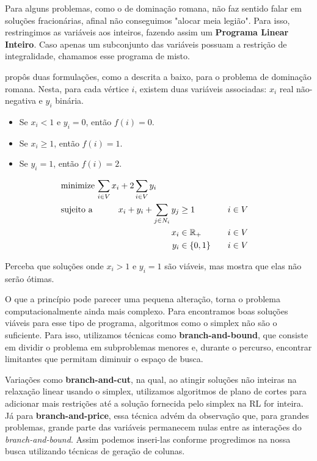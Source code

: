 \documentclass[11pt]{article}
\begin{document}
{Para alguns problemas, como o de dominação romana, não faz sentido falar em soluções fracionárias, afinal não conseguimos "alocar meia legião".
Para isso, restringimos as variáveis aos inteiros, fazendo assim um \textbf{Programa Linear Inteiro}. Caso apenas um subconjunto das variáveis possuam a restrição de integralidade, chamamos esse programa de misto.

\textcite{Ivanovic2016Improvedmixedinteger} propôs duas formulações, como a descrita a baixo, para o problema de dominação romana.
Nesta, para cada vértice \(i\), existem duas variáveis associadas: \(x_i\) real não-negativa e \(y_i\) binária.
\begin{itemize}
\item Se \(x_i < 1\) e \(y_i = 0\), então \(f(i) = 0\).
\item Se \(x_i \geq 1\), então \(f(i) = 1\).
\item Se \(y_i = 1\), então \(f(i) = 2\).
\end{itemize}

\begin{alignat*}{4}
& \omit\rlap{minimize  $\displaystyle \sum_{i \in V} x_i+2\sum_{i \in V} y_i$} \\
& \mbox{sujeito a}&& \quad & x_i+y_i+\sum_{j \in N_i} y_j & \geq 1  & \quad & i \in V \\
&                 &&       & x_i               & \in \mathbb{R}_+ &      & i \in V \\
&                 &&       & y_i               & \in \{0,1\}      &      & i \in V
\end{alignat*}

Perceba que soluções onde \(x_i > 1\) e \(y_i = 1\) são viáveis, mas \textcite{Ivanovic2016Improvedmixedinteger} mostra que elas não serão ótimas.

O que a princípio pode parecer uma pequena alteração, torna o problema computacionalmente ainda mais complexo. Para encontramos boas soluções viáveis para esse tipo de programa, algoritmos como o simplex não são o suficiente. Para isso, utilizamos técnicas como \textbf{branch-and-bound}, que consiste em dividir o problema em subproblemas menores e, durante o percurso, encontrar limitantes que permitam diminuir o espaço de busca.

Variações como \textbf{branch-and-cut}, na qual, ao atingir soluções não inteiras na relaxação linear usando o simplex, utilizamos algoritmos de plano de cortes para adicionar mais restrições até a solução fornecida pelo simplex na RL for inteira.
Já para \textbf{branch-and-price}, essa técnica advém da observação que, para grandes problemas, grande parte das variáveis permanecem nulas entre as interações do \emph{branch-and-bound}.
Assim podemos inseri-las conforme progredimos na nossa busca utilizando técnicas de geração de colunas.
}
\end{document}

